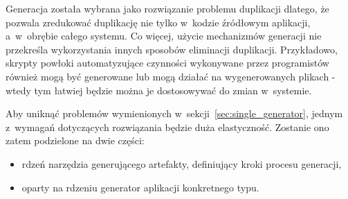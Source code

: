 Generacja została wybrana jako rozwiązanie problemu duplikacji dlatego, że pozwala zredukować duplikację nie tylko w~kodzie źródłowym aplikacji, a~w~obrębie całego systemu.
Co więcej, użycie mechanizmów generacji nie przekreśla wykorzystania innych sposobów eliminacji duplikacji.
Przykładowo, skrypty powłoki automatyzujące czynności wykonywane przez programistów również mogą być generowane lub mogą działać na wygenerowanych plikach - wtedy tym łatwiej będzie można je dostosowywać do zmian w~systemie.

Aby uniknąć problemów wymienionych w~sekcji~\ref{sec:single_generator}, jednym z~wymagań dotyczących rozwiązania będzie duża elastyczność.
Zostanie ono zatem podzielone na dwie części:

\begin{itemize}
 \item rdzeń narzędzia generującego artefakty, definiujący kroki procesu generacji,
 \item oparty na rdzeniu generator aplikacji konkretnego typu.
\end{itemize}

